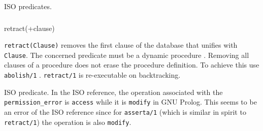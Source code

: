 \begin{PlErrors}





\end{PlErrors}

\Portability

ISO predicates.

\subsubsection{}

\begin{TemplatesOneCol}
retract(+clause)

\end{TemplatesOneCol}

\Description

\texttt{retract(Clause)} removes the first clause of the database
that unifies with \texttt{Clause}. The concerned predicate must be a
dynamic procedure
. Removing all clauses
of a procedure does not erase the procedure definition. To achieve
this use \texttt{abolish/1} . \texttt{retract/1} is
re-executable on backtracking.

\begin{PlErrors}




\end{PlErrors}

\Portability

ISO predicate. In the ISO reference, the operation associated with the
\texttt{permission\_error} is \texttt{access} while it is \texttt{modify} in
GNU Prolog. This seems to be an error of the ISO reference since for
\texttt{asserta/1} (which is similar in spirit to \texttt{retract/1}) the
operation is also \texttt{modify}.

